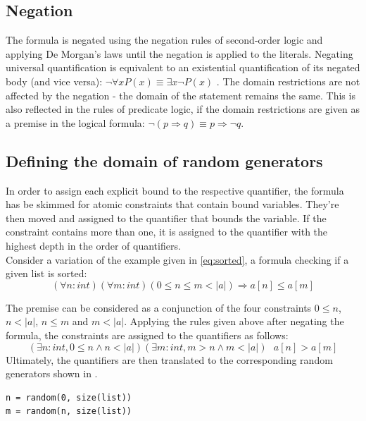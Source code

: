 \subsection{Negation}
The formula is negated using the negation rules of second-order logic and applying De Morgan's laws until the negation is applied to the literals. Negating universal quantification is equivalent to an existential quantification of its negated body (and vice versa): $\neg \forall x P(x) \equiv \exists x \neg P(x)$ \cite{Sundstrom2020Quantifiers}. The domain restrictions are not affected by the negation - the domain of the statement remains the same. This is also reflected in the rules of predicate logic, if the domain restrictions are given as a premise in the logical formula: $\neg (p \Rightarrow q) \equiv p \Rightarrow \neg q $.

\subsection{Defining the domain of random generators}
In order to assign each explicit bound to the respective quantifier, the formula has be skimmed for atomic constraints that contain bound variables. They're then moved and assigned to the quantifier that bounds the variable. If the constraint contains more than one, it is assigned to the quantifier with the highest depth in the order of quantifiers. \\
Consider a variation of the example given in \eqref{eq:sorted}, a formula checking if a given list is sorted:
\begin{equation}\label{eq:sorted_v2}
	(\forall n : int)(\forall m : int) (0 \leq n \le m < |a|) \Rightarrow a[n] \leq a[m]
\end{equation}

The premise can be considered as a conjunction of the four constraints $0 \leq n$, $n < |a| $, $n \le m$ and $m < |a|$. Applying the rules given above after negating the formula, the constraints are assigned to the quantifiers as follows:
\begin{equation}\label{eq:sorted_v2_bounds}
	(\exists n : int, 0 \leq n \wedge n < |a|)(\exists m : int, m > n \wedge m < |a|) \text{ } a[n] > a[m]
\end{equation}
Ultimately, the quantifiers are then translated to the corresponding random generators shown in .
\begin{lstlisting}[label=lst:rand]
n = random(0, size(list))
m = random(n, size(list))
\end{lstlisting}


